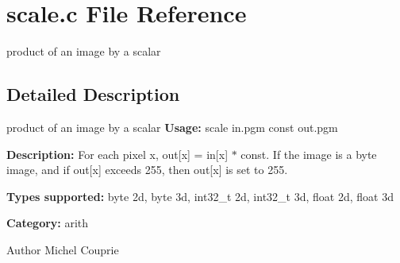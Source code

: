 \section{scale.c File Reference}
\label{scale_8c}


product of an image by a scalar  




\subsection{Detailed Description}
product of an image by a scalar {\bfseries Usage:} scale in.pgm const out.pgm

{\bfseries Description:} For each pixel x, out[x] = in[x] $\ast$ const. If the image is a byte image, and if out[x] exceeds 255, then out[x] is set to 255.

{\bfseries Types supported:} byte 2d, byte 3d, int32\_\-t 2d, int32\_\-t 3d, float 2d, float 3d

{\bfseries Category:} arith

\begin{DoxyAuthor}{Author}
Michel Couprie 
\end{DoxyAuthor}
